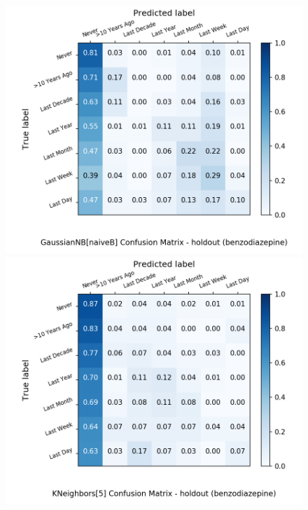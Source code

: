 \begin{figure}[H]
	\begin{minipage}[b]{0.32\textwidth}
		\includegraphics[width=1.1\textwidth]{Plots/drugs/benzodiazepine_GaussianNB_naiveB_balance_False_holdout.png}
	\end{minipage}
	\begin{minipage}[b]{0.32\textwidth}
		\includegraphics[width=1.1\textwidth]{Plots/drugs/benzodiazepine_KNeighbors_5_balance_False_holdout.png}
  \end{minipage}
	\begin{minipage}[b]{0.32\textwidth}

\end{minipage}
\end{figure}
